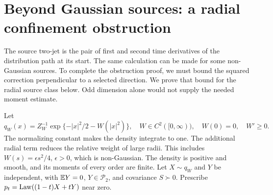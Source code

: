 \section{Beyond Gaussian sources: a radial confinement obstruction}
\label{app:radial-extension}
The source two-jet is the pair of first and second time derivatives of
the distribution path at its start. The same calculation can be made for
some non-Gaussian sources. To complete the obstruction proof, we must
bound the squared correction perpendicular to a selected direction.
We prove that bound for the radial source class below. Odd dimension alone
would not supply the needed moment estimate.\AIassistance

Let
\begin{equation}
 q_W(x)=Z_W^{-1}\exp\{-|x|^2/2-W(|x|^2)\},
 \quad W\in C^2([0,\infty)),\quad W(0)=0,\quad W'\ge0.
 \label{eq:radial-source}
\end{equation}
The normalizing constant makes the density integrate to one. The
additional radial term reduces the relative weight of large radii.
This includes $W(s)=\epsilon s^2/4$, $\epsilon>0$, which is non-Gaussian.
The density is positive and smooth, and its moments of every order are finite. Let
$X\sim q_W$ and $Y$ be independent, with $\mathbb E Y=0$, $Y\in\mathcal P_2$,
and covariance $S\succ0$. Prescribe $p_t=\operatorname{Law}((1-t)X+tY)$ near zero.

